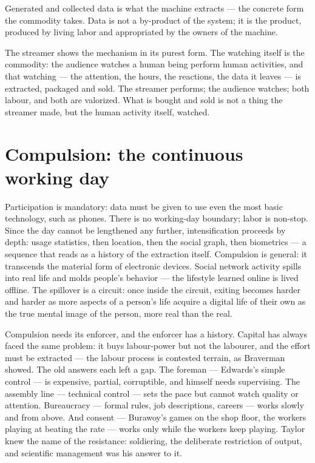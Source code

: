 \documentclass[11pt]{article}
\begin{document}
Generated and collected data is what the machine extracts --- the
concrete form the commodity takes. Data is not a by-product of the
system; it is the product, produced by living labor and appropriated by
the owners of the machine.

The streamer shows the mechanism in its purest form. The watching
itself is the commodity: the audience watches a human being perform
human activities, and that watching --- the attention, the hours, the
reactions, the data it leaves --- is extracted, packaged and sold. The
streamer performs; the audience watches; both labour, and both are
valorized. What is bought and sold is not a thing the streamer made,
but the human activity itself, watched.

\section{Compulsion: the continuous working day}

Participation is mandatory: data must be given to use even the most
basic technology, such as phones. There is no working-day boundary;
labor is non-stop. Since the day cannot be lengthened any further,
intensification proceeds by depth: usage statistics, then location,
then the social graph, then biometrics --- a sequence that reads as a
history of the extraction itself. Compulsion is general: it transcends
the material form of electronic devices. Social network activity spills
into real life and molds people's behavior --- the lifestyle learned
online is lived offline. The spillover is a circuit: once inside the
circuit, exiting becomes harder and harder as more aspects of a person's
life acquire a digital life of their own as the true mental image of
the person, more real than the real.

Compulsion needs its enforcer, and the enforcer has a history. Capital
has always faced the same problem: it buys labour-power but not the
labourer, and the effort must be extracted --- the labour process is
contested terrain, as Braverman showed. The old answers each left a
gap. The foreman --- Edwards's simple control --- is expensive, partial,
corruptible, and himself needs supervising. The assembly line ---
technical control --- sets the pace but cannot watch quality or
attention. Bureaucracy --- formal rules, job descriptions, careers ---
works slowly and from above. And consent --- Burawoy's games on the
shop floor, the workers playing at beating the rate --- works only while
the workers keep playing. Taylor knew the name of the resistance:
soldiering, the deliberate restriction of output, and scientific
management was his answer to it.
\end{document}
